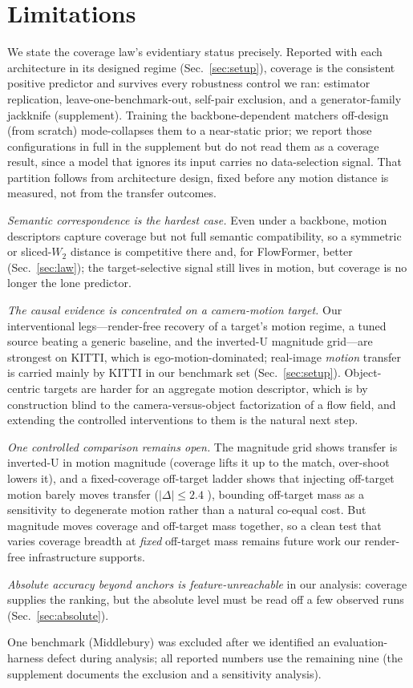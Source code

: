 \section{Limitations}
\label{sec:limits}

We state the coverage law's evidentiary status precisely. Reported with each
architecture in its designed regime (Sec.~\ref{sec:setup}), coverage is the
consistent positive predictor and survives every robustness control we ran:
estimator replication, leave-one-benchmark-out, self-pair exclusion, and a
generator-family jackknife (supplement). Training the backbone-dependent matchers
off-design (from scratch) mode-collapses them to a near-static prior; we report
those configurations in full in the supplement but do
not read them as a coverage result, since a model that ignores its input carries
no data-selection signal. That partition follows from architecture design, fixed
before any motion distance is measured, not from the transfer outcomes.

\noindent\emph{Semantic correspondence is the hardest case.} Even under a
backbone, motion descriptors capture coverage but not full semantic
compatibility, so a symmetric or sliced-$W_2$ distance is competitive there and,
for FlowFormer, better (Sec.~\ref{sec:law}); the target-selective signal still
lives in motion, but coverage is no longer the lone predictor.

\noindent\emph{The causal evidence is concentrated on a camera-motion target.}
Our interventional legs---render-free recovery of a target's motion regime, a
tuned source beating a generic baseline, and the inverted-U magnitude grid---are
strongest on KITTI, which is ego-motion-dominated; real-image \emph{motion}
transfer is carried mainly by KITTI in our benchmark set (Sec.~\ref{sec:setup}).
Object-centric targets are harder for an aggregate motion descriptor, which is by
construction blind to the camera-versus-object factorization of a flow field, and
extending the controlled interventions to them is the natural next step.

\noindent\emph{One controlled comparison remains open.} The magnitude grid shows
transfer is inverted-U in motion magnitude (coverage lifts it up to the match,
over-shoot lowers it), and a fixed-coverage off-target ladder shows that injecting
off-target motion barely moves transfer ($|\Delta|\le2.4$ \pck), bounding
off-target mass as a sensitivity to degenerate motion rather than a natural
co-equal cost. But magnitude moves coverage and off-target mass together, so a
clean test that varies coverage breadth at \emph{fixed} off-target mass remains
future work our render-free infrastructure supports.

\noindent\emph{Absolute accuracy beyond anchors is feature-unreachable} in our
analysis: coverage supplies the ranking, but the absolute \pck{} level must be
read off a few observed runs (Sec.~\ref{sec:absolute}).

One benchmark (Middlebury) was excluded after we identified an evaluation-harness
defect during analysis; all reported numbers use the remaining nine (the
supplement documents the exclusion and a sensitivity analysis).
